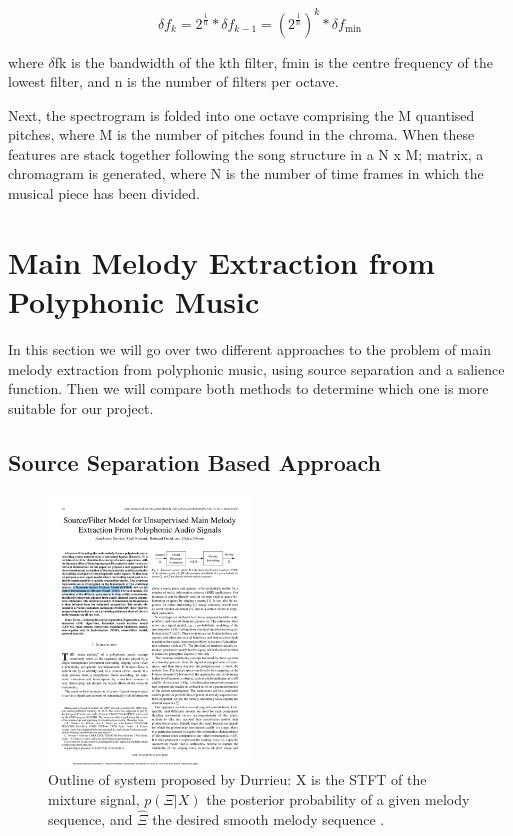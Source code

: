\begin{equation}
\delta f_k = 2^{ \frac {1}{n} } * \delta f_{k-1} = \left ( {2^{ \frac {1}{n} }} \right )^{k} * \delta f_{\mathrm{min}}
\end{equation}

where $\delta$fk is the bandwidth of the kth filter, fmin is the centre frequency of the lowest filter, and n is the number of filters per octave.

Next, the spectrogram is folded into one octave comprising the M quantised pitches, where M is the number of pitches found in the chroma. When these features are stack together following the song structure in a N x M; matrix, a chromagram is generated, where N is the number of time frames in which the musical piece has been divided.

\vspace{20pt}

\section{Main Melody Extraction from Polyphonic Music}
In this section we will go over two different approaches to the problem of main melody extraction from polyphonic music, using source separation and a salience function. Then we will compare both methods to determine which one is more suitable for our project.

\vspace{10pt}

\subsection{Source Separation Based Approach}

\begin{figure}
  \vspace{-50pt}

  \begin{center}
    \includegraphics[width=0.48\textwidth]{Figures/durrieudiagram}
  \end{center}
  \caption{Outline of system proposed by Durrieu: X is the STFT of the mixture signal, $p(\Xi|X)$ the posterior probability of a given melody sequence, and $\hat{\Xi} $ the desired smooth melody sequence \cite{durrieu}.}
  \label{fig:durrieu}
\end{figure}


